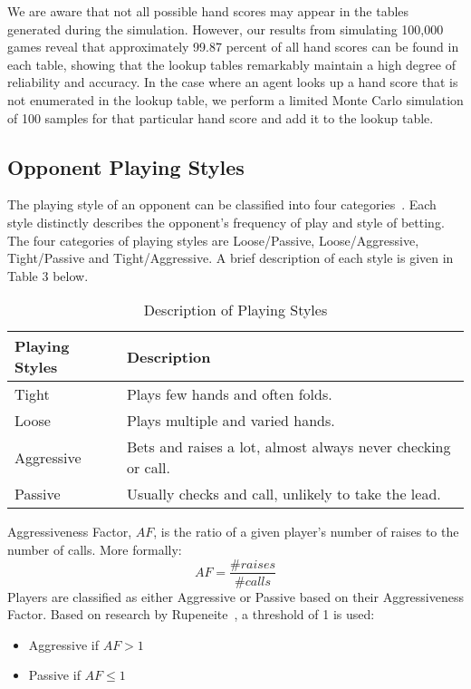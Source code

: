 \documentclass{article}
\begin{document}
\noindent We are aware that not all possible hand scores may appear in the tables generated during the simulation. However, our results from simulating 100,000 games reveal that approximately 99.87 percent of all hand scores can be found in each table, showing that the lookup tables remarkably maintain a high degree of reliability and accuracy. In the case where an agent looks up a hand score that is not enumerated in the lookup table, we perform a limited Monte Carlo simulation of 100 samples for that particular hand score and add it to the lookup table.

\subsection{Opponent Playing Styles}

The playing style of an opponent can be classified into four categories~\cite{rupeneite:Reinforcement}. Each style distinctly describes the opponent's frequency of play and style of betting. The four categories of playing styles are Loose/Passive, Loose/Aggressive, Tight/Passive and Tight/Aggressive. A brief description of each style is given in Table 3 below.

\begin{table}[h!]
  \begin{center}
    \begin{tabular}{|l|p{5cm}|}
    \hline
      \textbf{Playing Styles} & \textbf{Description} \\
      \hline
      Tight & Plays few hands and often folds. \\
      \hline
      Loose & Plays multiple and varied hands.  \\
      \hline
      Aggressive & Bets and raises a lot, almost always never checking or call. \\
      \hline
      Passive & Usually checks and call, unlikely to take the lead. \\
      \hline
    \end{tabular}
    \caption{Description of Playing Styles}
    \label{tab:table3}
  \end{center}
\end{table}

Aggressiveness Factor, $AF$, is the ratio of a given player's number of raises to the number of calls. More formally:
\begin{displaymath}
  AF = \frac{\text{\# }raises}{\text{\# }calls}
\end{displaymath}
\noindent Players are classified as either Aggressive or Passive based on their Aggressiveness Factor. Based on research by Rupeneite~, a threshold of 1 is used:
\begin{itemize}
	\item Aggressive if $AF > 1$
	\item Passive if $AF \leq 1$
\end{itemize}
\end{document}
